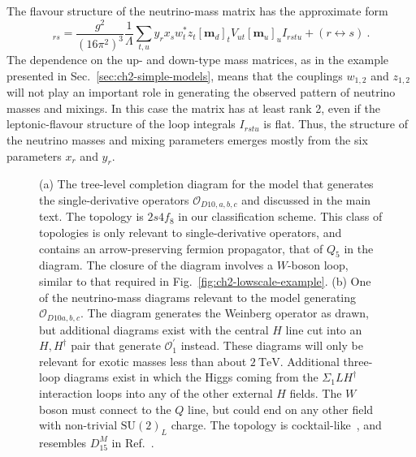 The flavour structure of the neutrino-mass matrix has the approximate form
\begin{equation}
  [\mathbf{m}_{\nu}]_{rs} = \frac{g^{2}}{(16\pi^{2})^{3}} \frac{1}{\Lambda} \sum_{t,u} y_{r} x_{s} w^{*}_{t} z_{t} [\mathbf{m}_{d}]_{t} V_{ut} [\mathbf{m}_{u}]_{u} I_{rstu} + (r \leftrightarrow s) \ .
\end{equation}
The dependence on the up- and down-type mass matrices, as in the example
presented in Sec.~\ref{sec:ch2-simple-models}, means that the couplings $w_{1,2}$
and $z_{1,2}$ will not play an important role in generating the observed pattern
of neutrino masses and mixings. In this case the matrix has at least rank 2,
even if the leptonic-flavour structure of the loop integrals $I_{rstu}$ is flat.
Thus, the structure of the neutrino masses and mixing parameters emerges mostly
from the six parameters $x_{r}$ and $y_{r}$.

\begin{figure}[t]
  \centering
  \caption[(a) The tree-level completion diagram for the model that generates
  the single-derivative operators $\mathcal{O}_{D10,a,b,c}$ and discussed in the
  main text. (b) One of the neutrino-mass diagrams relevant to the model
  generating $\mathcal{O}_{D10a,b,c}$.]{(a) The tree-level completion diagram
    for the model that generates the single-derivative operators
    $\mathcal{O}_{D10,a,b,c}$ and discussed in the main text. The topology is
    $2s4f_{8}$ in our classification scheme. This class of topologies is only
    relevant to single-derivative operators, and contains an arrow-preserving
    fermion propagator, that of $Q_{5}$ in the diagram. The closure of the
    diagram involves a $W$-boson loop, similar to that required in
    Fig.~\ref{fig:ch2-lowscale-example}. (b) One of the neutrino-mass diagrams
    relevant to the model generating $\mathcal{O}_{D10a,b,c}$. The diagram
    generates the Weinberg operator as drawn, but additional diagrams exist with
    the central $H$ line cut into an $H,H^{\dagger}$ pair that generate
    $\mathcal{O}^{\prime}_{1}$ instead. These diagrams will only be relevant for
    exotic masses less than about $\SI{2}{\TeV}$. Additional three-loop diagrams
    exist in which the Higgs coming from the $\Sigma_{1}LH^{\dagger}$
    interaction loops into any of the other external $H$ fields. The $W$ boson
    must connect to the $Q$ line, but could end on any other field with
    non-trivial $\mathrm{SU}(2)_{L}$ charge. The topology is
    cocktail-like~\cite{Gustafsson:2012vj}, and resembles $D^{M}_{15}$ in
    Ref.~\cite{Cepedello:2018rfh}.}
  \label{fig:ch2-derivative-example-diagrams}
\end{figure}

